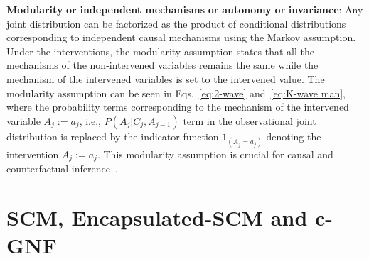 \documentclass[letterpaper]{article} %
\begin{document}
\begin{inparaenum}[1.]
\item \textbf{Modularity} \textbf{or} \textbf{independent mechanisms} \textbf{or} \textbf{autonomy} \textbf{or} \textbf{invariance}: Any joint distribution can be factorized as the product of conditional distributions corresponding to independent causal mechanisms using the Markov assumption.
Under the interventions, the modularity assumption states that all the mechanisms of the non-intervened variables remains the same while the mechanism of the intervened variables is set to the intervened value.
The modularity assumption can be seen in Eqs.~\eqref{eq:2-wave} and~\eqref{eq:K-wave man}, where the probability terms corresponding to the mechanism of the intervened variable ${A_j}{ := }a_j$, i.e., $P(A_j|C_{j},A_{j-1})$ term in the observational joint distribution is replaced by the indicator function $1_{({A_j}{ = }a_j)}$ denoting the intervention ${A_j}{ := }a_j$.
This modularity assumption is crucial for causal and counterfactual inference~\cite{pearl2009abductionactionprediction, pearl2009causality, pearl2018bookofwhy}.
\end{inparaenum}



































\section{SCM, Encapsulated-SCM and c-GNF}\label{sec:gnf}%
\end{document}

